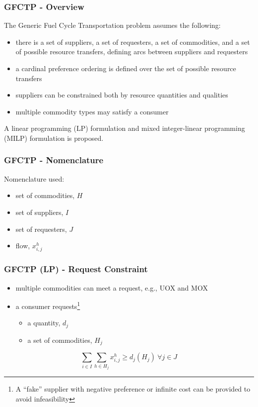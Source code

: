 \begin{frame}[ctb!]
  \frametitle{GFCTP - Overview}
  
  The Generic Fuel Cycle Transportation problem assumes the following:
  \begin{itemize}
    \item there is a set of suppliers, a set of requesters, a set of
      commodities, and a set of possible resource transfers, defining arcs
      between suppliers and requesters
    \item a cardinal preference ordering is defined over the set of possible
      resource transfers
    \item suppliers can be constrained both by resource quantities and qualities
    \item multiple commodity types may satisfy a consumer
  \end{itemize}

  A linear programming (LP) formulation and mixed integer-linear programming
  (MILP) formulation is proposed.

\end{frame}
  

\begin{frame}[ctb!]
  \frametitle{GFCTP - Nomenclature}

  Nomenclature used:
  \begin{itemize}
    \item set of commodities, $H$
    \item set of suppliers, $I$
    \item set of requesters, $J$
    \item flow, $x^h_{i,j}$
  \end{itemize}

\end{frame}

\begin{frame}[ctb!]
  \frametitle{GFCTP (LP) - Request Constraint}
  
  \begin{itemize}
    \item multiple commodities can meet a request, e.g., UOX and MOX
    \item a consumer requests\footnote{A ``fake'' supplier with negative
      preference or infinite cost can be provided to avoid infeasibility}
      \begin{itemize}
        \item a quantity, $d_j$
        \item a set of commodities, $H_j$
      \end{itemize}
  \end{itemize}

  \begin{equation}
    \sum_{i \in I}\sum_{h \in H_{j}} x_{i,j}^{h} \geq d_{j}(H_{j})  \: \forall j \in J
  \end{equation}
  
\end{frame}

